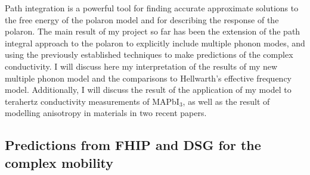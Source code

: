 
Path integration is a powerful tool for finding accurate approximate solutions to the free energy of the polaron model and for describing the response of the polaron. The main result of my project so far has been the extension of the path integral approach to the polaron to explicitly include multiple phonon modes, and using the previously established techniques to make predictions of the complex conductivity. I will discuss here my interpretation of the results of my new multiple phonon model and the comparisons to Hellwarth's effective frequency model. Additionally, I will discuss the result of the application of my model to terahertz conductivity measurements of MAPbI$_3$, as well as the result of modelling anisotropy in materials in two recent papers. 

\subsection{Predictions from FHIP and DSG for the complex mobility}

